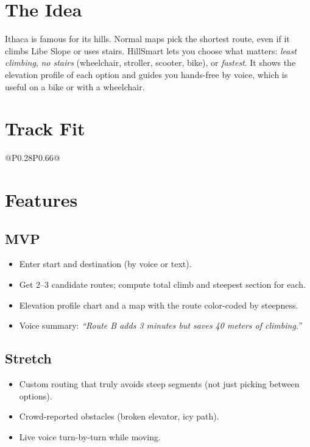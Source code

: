 \documentclass[11pt]{article}
\begin{document}

\section{The Idea}
Ithaca is famous for its hills. Normal maps pick the shortest route, even if it
climbs Libe Slope or uses stairs. HillSmart lets you choose what matters:
\emph{least climbing}, \emph{no stairs} (wheelchair, stroller, scooter, bike), or
\emph{fastest}. It shows the elevation profile of each option and guides you
hands-free by voice, which is useful on a bike or with a wheelchair.

\section{Track Fit}
\begin{tabular}{@{}P{0.28\textwidth}P{0.66\textwidth}@{}}
\toprule
{}
\bottomrule
\end{tabular}

\section{Features}
\subsection{MVP}
\begin{itemize}
  \item Enter start and destination (by voice or text).
  \item Get 2--3 candidate routes; compute total climb and steepest section for each.
  \item Elevation profile chart and a map with the route color-coded by steepness.
  \item Voice summary: \emph{``Route B adds 3 minutes but saves 40 meters of climbing.''}
\end{itemize}
\subsection{Stretch}
\begin{itemize}
  \item Custom routing that truly avoids steep segments (not just picking between options).
  \item Crowd-reported obstacles (broken elevator, icy path).
  \item Live voice turn-by-turn while moving.
\end{itemize}
\end{document}
